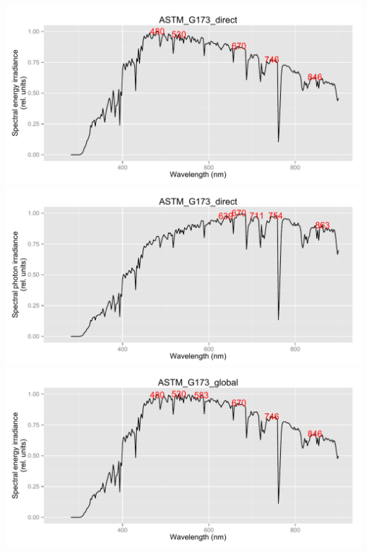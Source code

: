 \documentclass{article}\usepackage{knitr}
\begin{document}
\begin{knitrout}\footnotesize
{}\color{fgcolor}\begin{kframe}
\begin{alltt}
 \hlkwb{<-} \hlstd{(}\hlstd{,} \hlstd{)}
   
  \hlstd{(}
\hlstd{\}}
\end{alltt}
\end{kframe}

{\centering \includegraphics[width=.95\textwidth]{figure/pos-terrestrial-std1} 
\includegraphics[width=.95\textwidth]{figure/pos-terrestrial-std2} 
\includegraphics[width=.95\textwidth]{figure/pos-terrestrial-std3} 
}
\end{knitrout}
\end{document}
